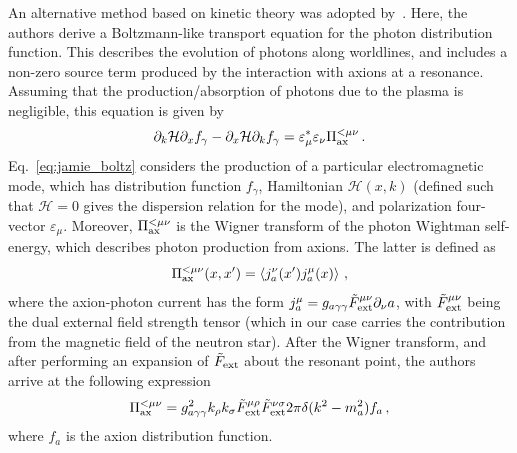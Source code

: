\documentclass[twocolumn,superscriptaddress,floatfix,preprintnumbers,prd,nofootinbib,aps,10pt]{revtex4-2}
\renewcommand\({\left(}
\renewcommand\){\right)}
\renewcommand\[{\left[}
\renewcommand\]{\right]}
\begin{document}
An alternative method based on kinetic theory was adopted by~\cite{mcdonald2023axionphoton}. Here, the authors derive a Boltzmann-like transport equation for the photon distribution function. This describes the evolution of photons along worldlines, and includes a non-zero source term produced by the interaction with axions at a resonance. Assuming that the production/absorption of photons due to the plasma is negligible, this equation is given by
%
\begin{equation}\label{eq:jamie_boltz}
    \partial_k \mathcal{H} \partial_x f_\gamma - \partial_x \mathcal{H} \partial_k f_\gamma = \varepsilon^*_\mu \varepsilon_\nu \Pi_{\rm ax}^{< \mu\nu} \, .
\end{equation}
%
Eq.~\ref{eq:jamie_boltz} considers the production of a particular electromagnetic mode, which has distribution function $f_\gamma$, Hamiltonian $\mathcal{H}(x,k)$ (defined such that $\mathcal{H} = 0$ gives the dispersion relation for the mode), and polarization four-vector $\varepsilon_\mu$. Moreover, $\Pi_{\rm ax}^{< \mu\nu}$ is the Wigner transform of the photon Wightman self-energy, which describes photon production from axions. The latter is defined as
%
\begin{equation}
    \Pi_{\rm ax}^{< \mu\nu}(x, x^\prime) = \left< j^\nu_a(x^\prime) j_a^\mu(x) \right> \, ,
\end{equation}
%
where the axion-photon current has the form $j^\mu_a = g_{a\gamma\gamma} \tilde{F}^{\mu\nu}_{\rm ext} \partial_\nu a$, with $\tilde{F}^{\mu\nu}_{\rm ext}$ being the dual external field strength tensor (which in our case carries the contribution from the magnetic field of the neutron star). After the Wigner transform, and after performing an expansion of $\tilde{F}_{\rm ext}$ about the resonant point, the authors arrive at the following expression
%
\begin{equation}
    \Pi_{\rm ax}^{< \mu\nu} = g_{a\gamma\gamma}^2 k_\rho k_\sigma \tilde{F}^{\mu\rho}_{\rm ext} \tilde{F}^{\nu\sigma}_{\rm ext} 2\pi \delta(k^2 - m_a^2) f_a \, ,
\end{equation}
%
where $f_a$ is the axion distribution function. 
\end{document}
